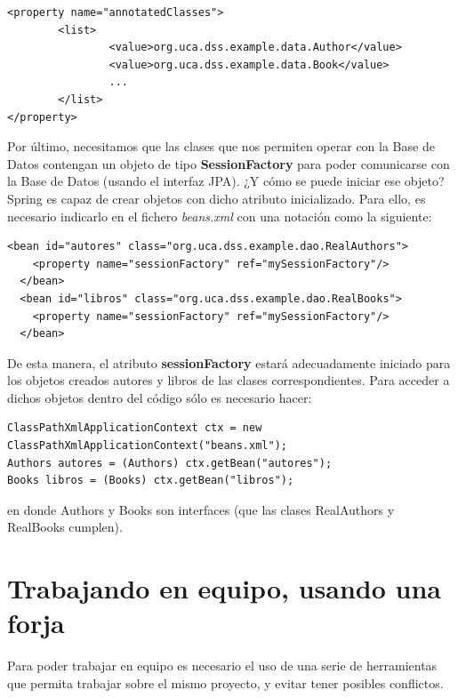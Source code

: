 \documentclass[11pt]{article}
\begin{document}
\begin{lstlisting}
<property name="annotatedClasses">
        <list>
                <value>org.uca.dss.example.data.Author</value>
                <value>org.uca.dss.example.data.Book</value>
                ...
        </list>
</property>     
\end{lstlisting}


Por último, necesitamos que las clases que nos permiten operar con la Base de Datos contengan un
objeto de tipo \textbf{SessionFactory} para poder comunicarse con la Base de Datos (usando el interfaz JPA). 
¿Y cómo se puede iniciar ese objeto? Spring es capaz de crear objetos con dicho atributo inicializado. 
Para ello, es necesario indicarlo en el fichero \emph{beans.xml} con una notación como la siguiente:


\begin{lstlisting}
<bean id="autores" class="org.uca.dss.example.dao.RealAuthors">
    <property name="sessionFactory" ref="mySessionFactory"/>
  </bean>
  <bean id="libros" class="org.uca.dss.example.dao.RealBooks">
    <property name="sessionFactory" ref="mySessionFactory"/>
  </bean>
\end{lstlisting}


De esta manera, el atributo \textbf{sessionFactory} estará adecuadamente iniciado para los objetos
creados autores y libros de las clases correspondientes. Para acceder a dichos objetos dentro
del código sólo es necesario hacer:


\lstset{language=java}
\begin{lstlisting}
ClassPathXmlApplicationContext ctx = new ClassPathXmlApplicationContext("beans.xml");           
Authors autores = (Authors) ctx.getBean("autores");
Books libros = (Books) ctx.getBean("libros");
\end{lstlisting}


en donde Authors y Books son interfaces (que las clases RealAuthors y RealBooks cumplen).
\section{Trabajando en equipo, usando una forja}
\label{sec-7}




Para poder trabajar en equipo es necesario el uso de una serie de herramientas que permita trabajar sobre el 
mismo proyecto, y evitar tener posibles conflictos. 
\end{document}
